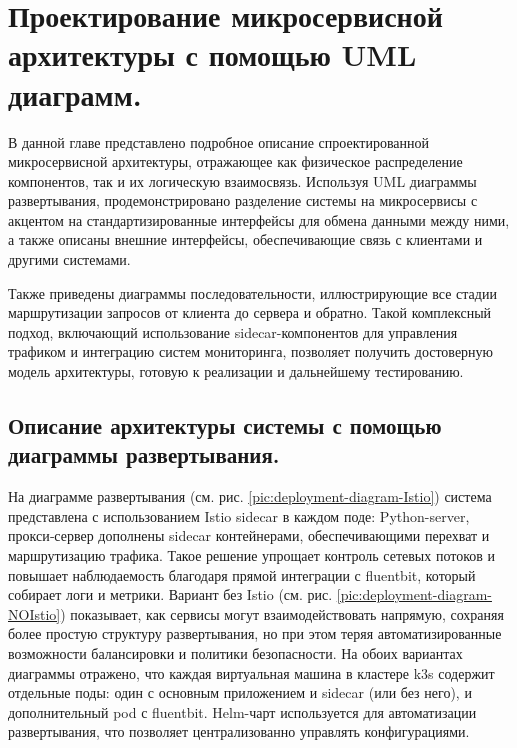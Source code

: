 \chapter{Проектирование микросервисной архитектуры с помощью UML диаграмм. }

В данной главе представлено подробное описание спроектированной микросервисной архитектуры, отражающее как физическое распределение компонентов, так и их логическую взаимосвязь. Используя UML диаграммы развертывания, продемонстрировано разделение системы на микросервисы с акцентом на стандартизированные интерфейсы для обмена данными между ними, а также описаны внешние интерфейсы, обеспечивающие связь с клиентами и другими системами.

Также приведены диаграммы последовательности, иллюстрирующие все стадии маршрутизации запросов от клиента до сервера и обратно. Такой комплексный подход, включающий использование sidecar-компонентов для управления трафиком и интеграцию систем мониторинга, позволяет получить достоверную модель архитектуры, готовую к реализации и дальнейшему тестированию.


\section{Описание архитектуры системы с помощью диаграммы развертывания.}

На диаграмме развертывания (см. рис. \ref{pic:deployment-diagram-Istio}) система представлена с использованием Istio sidecar в каждом поде: Python-server, прокси‐сервер дополнены sidecar контейнерами, обеспечивающими перехват и маршрутизацию трафика. Такое решение упрощает контроль сетевых потоков и повышает наблюдаемость благодаря прямой интеграции с fluentbit, который собирает логи и метрики. Вариант без Istio (см. рис. \ref{pic:deployment-diagram-NOIstio}) показывает, как сервисы могут взаимодействовать напрямую, сохраняя более простую структуру развертывания, но при этом теряя автоматизированные возможности балансировки и политики безопасности. На обоих вариантах диаграммы отражено, что каждая виртуальная машина в кластере k3s содержит отдельные поды: один с основным приложением и sidecar (или без него), и дополнительный pod с fluentbit. Helm-чарт используется для автоматизации развертывания, что позволяет централизованно управлять конфигурациями. 


